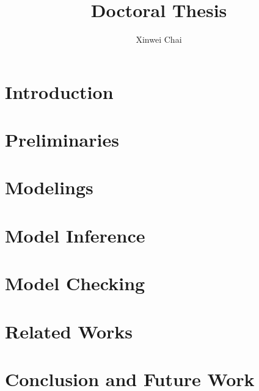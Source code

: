 \documentclass[12pt]{report}
\title{Doctoral Thesis}
\author{Xinwei Chai}
\begin{document}
\maketitle
\chapter{Introduction}
\chapter{Preliminaries}
\chapter{Modelings}
\chapter{Model Inference}
\chapter{Model Checking}
\chapter{Related Works}
\chapter{Conclusion and Future Work}


\end{document}
